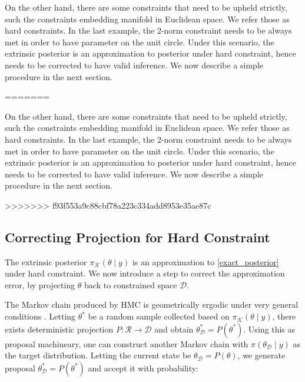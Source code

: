 \documentclass[10pt]{article}
\newcommand{\leo}[1]{{\color{blue}{\it leo: #1}}}
\newcommand{\mc}[1]{\mathcal{#1}}
\DeclareMathOperator{\1}{\mathbbm{1}}
\begin{document}
On the other hand, there are some constraints that need to be upheld strictly, such the constraints embedding manifold in Euclidean space. We refer those as hard constraints. In the last example, the $2$-norm constraint needs to be always met in order to have parameter on the unit circle. Under this scenario, the extrinsic posterior is an approximation to posterior under hard constraint, hence needs to be corrected to have valid inference. We now describe a simple procedure in the next section.

=======


On the other hand, there are some constraints that need to be upheld strictly, such the constraints embedding manifold in Euclidean space. We refer those as hard constraints. In the last example, the $2$-norm constraint needs to be always met in order to have parameter on the unit circle. Under this scenario, the extrinsic posterior is an approximation to posterior under hard constraint, hence needs to be corrected to have valid inference. We now describe a simple procedure in the next section.

>>>>>>> f93f553a9c88cbf78a223c334add8953e35ae87c
\subsection{Correcting Projection for Hard Constraint}
 
 The extrinsic posterior $\pi_{\mc K}(\theta \mid y)$ is an approximation to \eqref{exact_posterior} under hard constraint. We now introduce a step to correct the approximation error, by projecting $\theta$ back to constrained space $\mc D$.
 
The Markov chain produced by HMC is geometrically ergodic under very general conditions \citep{livingstone2016geometric}. Letting $\theta^*$ be a random sample collected based on $\pi_{\mc K}(\theta \mid y)$, there exists deterministic projection $P: \mc R\rightarrow \mc D$ and obtain $\theta^*_{\mc D}= P(\theta^*)$. Using this as proposal machineary, one can construct another Markov chain with $\pi(\theta_{\mc D}  \mid y)$ as the target distribution. Letting the current state be $\theta_{\mc D} = P(\theta)$, we generate proposal $\theta^*_{\mc D}= P(\theta^*)$ and accept it with probability:
\end{document}
